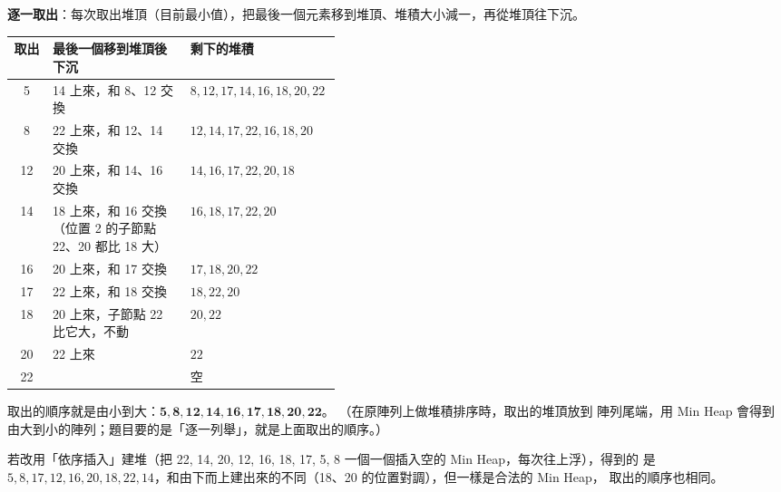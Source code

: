 \begin{pastsoln}
\textbf{逐一取出}：每次取出堆頂（目前最小值），把最後一個元素移到堆頂、堆積大小減一，再從堆頂往下沉。
\begin{center}
\small
\begin{tabular}{cp{0.42\linewidth}l}
\toprule
取出 & 最後一個移到堆頂後下沉 & 剩下的堆積 \\
\midrule
5 & 14 上來，和 8、12 交換 & $8, 12, 17, 14, 16, 18, 20, 22$ \\
8 & 22 上來，和 12、14 交換 & $12, 14, 17, 22, 16, 18, 20$ \\
12 & 20 上來，和 14、16 交換 & $14, 16, 17, 22, 20, 18$ \\
14 & 18 上來，和 16 交換（位置 2 的子節點 22、20 都比 18 大） & $16, 18, 17, 22, 20$ \\
16 & 20 上來，和 17 交換 & $17, 18, 20, 22$ \\
17 & 22 上來，和 18 交換 & $18, 22, 20$ \\
18 & 20 上來，子節點 22 比它大，不動 & $20, 22$ \\
20 & 22 上來 & $22$ \\
22 & & 空 \\
\bottomrule
\end{tabular}
\end{center}
取出的順序就是由小到大：$\mathbf{5, 8, 12, 14, 16, 17, 18, 20, 22}$。 （在原陣列上做堆積排序時，取出的堆頂放到
陣列尾端，用 Min Heap 會得到由大到小的陣列；題目要的是「逐一列舉」，就是上面取出的順序。）

若改用「依序插入」建堆（把 22, 14, 20, 12, 16, 18, 17, 5, 8 一個一個插入空的 Min Heap，每次往上浮），得到的
是 $5, 8, 17, 12, 16, 20, 18, 22, 14$，和由下而上建出來的不同（18、20 的位置對調），但一樣是合法的 Min Heap，
取出的順序也相同。
\end{pastsoln}
